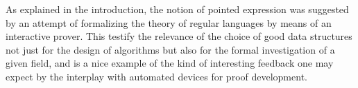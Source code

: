\documentclass[preprint]{sigplanconf}
\begin{document}
As explained in the introduction, the notion of pointed 
expression was suggested by an attempt of formalizing the theory
of regular languages by means of an interactive prover.
This testify the relevance of the choice of good data structures 
not just for the design of algorithms but also for the formal 
investigation of a given field, and is a 
nice example of the kind of interesting feedback one may expect 
by the interplay with automated devices for proof development. 






\end{document}
